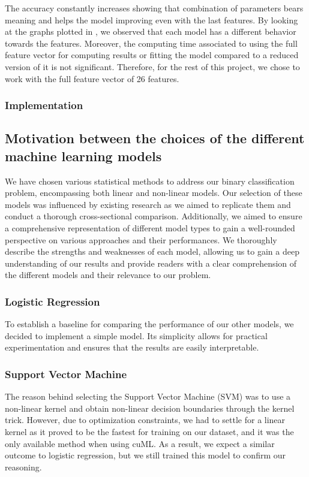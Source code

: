 \documentclass{article}
\begin{document}
    The accuracy constantly increases showing that combination of parameters bears meaning and helps the model improving even with the last features.
    By looking at the graphs plotted in , we observed that each model has a different behavior towards the features.
    Moreover, the computing time associated to using the full feature vector for computing results or fitting the model compared to a reduced version of it is not significant.
    Therefore, for the rest of this project, we chose to work with the full feature vector of 26 features.

    \subsubsection{Implementation}\label{subsubsec:implementation}

    \subsection{Motivation between the choices of the different machine learning models}\label{subsec:motivation-between-the-choices-of-the-different-machine-learning-models2}

    We have chosen various statistical methods to address our binary classification problem, encompassing both linear and non-linear models.
    Our selection of these models was influenced by existing research as we aimed to replicate them and conduct a thorough cross-sectional comparison.
    Additionally, we aimed to ensure a comprehensive representation of different model types to gain a well-rounded perspective on various approaches and their performances.
    We thoroughly describe the strengths and weaknesses of each model, allowing us to gain a deep understanding of our results and provide readers with a clear comprehension of the different models and their relevance to our problem.

    \subsubsection{Logistic Regression}
    To establish a baseline for comparing the performance of our other models, we decided to implement a simple model.
    Its simplicity allows for practical experimentation and ensures that the results are easily interpretable.

    \subsubsection{Support Vector Machine}\label{subsubsec:support-vector-machine}
    The reason behind selecting the Support Vector Machine (SVM) was to use a non-linear kernel and obtain non-linear decision boundaries through the kernel trick.
    However, due to optimization constraints, we had to settle for a linear kernel as it proved to be the fastest for training on our dataset, and it was the only available method when using cuML.
    As a result, we expect a similar outcome to logistic regression, but we still trained this model to confirm our reasoning.
\end{document}
